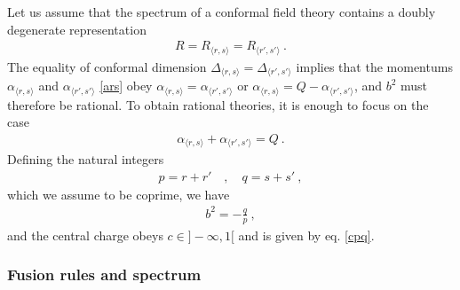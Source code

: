\documentclass[12pt, a4paper, notitlepage, twoside]{report}
\numberwithin{equation}{section}
\theoremstyle{break}
\begin{document}
Let us assume that the spectrum of a conformal field theory contains a doubly degenerate representation 
\begin{align}
 R=R_{\langle r,s \rangle}=R_{\langle r',s' \rangle}\ .
\end{align}
The equality of conformal dimension $\Delta_{\langle r,s \rangle}=\Delta_{\langle r',s' \rangle}$ implies that 
the momentums $\alpha_{\langle r,s \rangle}$ and $\alpha_{\langle r',s' \rangle}$ \eqref{ars} obey $\alpha_{\langle r,s \rangle}=\alpha_{\langle r',s' \rangle}$ or $\alpha_{\langle r,s \rangle}=Q-\alpha_{\langle r',s' \rangle}$, and $b^2$ must therefore be rational.
To obtain rational theories, it is enough to focus on the case 
\begin{align}
 \alpha_{\langle r,s \rangle}+\alpha_{\langle r',s' \rangle} = Q\ .
\end{align}
Defining the natural integers 
\begin{align}
 p = r+r' \quad , \quad q = s+s'\ ,
\end{align}
which we assume to be coprime, we have 
\begin{align} 
 \boxed{b^2 = - \frac{q}{p}} \ ,
\end{align}
and the central charge obeys $c\in ]-\infty, 1[$ and is given by eq. \eqref{cpq}.

\subsubsection{Fusion rules and spectrum}
\end{document}
